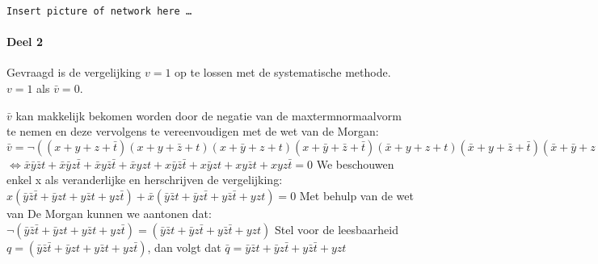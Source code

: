 \documentclass[12pt]{article}
\newcommand{\ov}[1]{\bar{#1}}
\begin{document}
\texttt{Insert picture of network here \ldots}

\paragraph{Deel 2}

Gevraagd is de vergelijking $v = 1$ op te lossen met de systematische methode. $v = 1$ als $\ov{v} = 0$.

$\ov{v}$ kan makkelijk bekomen worden door de negatie van de maxtermnormaalvorm te nemen en deze vervolgens te vereenvoudigen met de wet van de Morgan:
\vspace*{2mm}
\newline
$\ov{v} = \neg ((x+y+z+\ov{t}) (x+y+\ov{z}+t) (x+\ov{y}+z+t) (x+\ov{y}+\ov{z}+\ov{t}) (\ov{x}+y+z+t) (\ov{x}+y+\ov{z}+\ov{t}) (\ov{x}+\ov{y}+z+\ov{t}) (\ov{x}+\ov{y}+\ov{z}+t)) = 0$
\vspace*{2mm}
\newline
$\Leftrightarrow \ov{x}\ov{y}\ov{z}t + \ov{x}\ov{y}z\ov{t} + \ov{x}y\ov{z}\ov{t} + \ov{x}yzt + x\ov{y}\ov{z}\ov{t} + x\ov{y}zt + xy\ov{z}t + xyz\ov{t} = 0$
\vspace{2mm}
We beschouwen enkel x als veranderlijke en herschrijven de vergelijking:
\vspace{2mm}
\newline
$x(\ov{y}\ov{z}\ov{t} + \ov{y}zt + y\ov{z}t + yz\ov{t}) + \ov{x}(\ov{y}\ov{z}t + \ov{y}z\ov{t} + y\ov{z}\ov{t} + yzt) = 0$ 
\vspace{2mm}
\newline
Met behulp van de wet van De Morgan kunnen we aantonen dat:
\vspace{2mm}
\newline
$\neg (\ov{y}\ov{z}\ov{t} + \ov{y}zt + y\ov{z}t + yz\ov{t}) = (\ov{y}\ov{z}t + \ov{y}z\ov{t} + y\ov{z}\ov{t} + yzt)$
\vspace{2mm}
\newline
Stel voor de leesbaarheid $q = (\ov{y}\ov{z}\ov{t} + \ov{y}zt + y\ov{z}t + yz\ov{t})$, dan volgt dat 
$\ov{q} = \ov{y}\ov{z}t + \ov{y}z\ov{t} + y\ov{z}\ov{t} + yzt$
\vspace{2mm}
\newline
\end{document}
